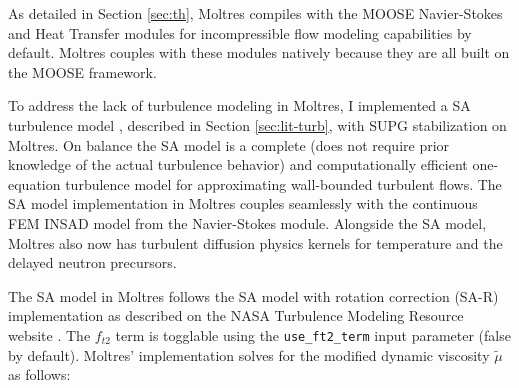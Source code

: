 As detailed in Section \ref{sec:th}, Moltres compiles with the MOOSE Navier-Stokes
\cite{peterson_overview_2018} and Heat Transfer modules for incompressible flow
modeling capabilities by default. Moltres couples with these modules natively because they are all
built on the MOOSE framework.


To address the lack of turbulence modeling in Moltres, I implemented a \gls{SA} turbulence model
\cite{spalart_one-equation_1994}, described in Section \ref{sec:lit-turb}, with \gls{SUPG}
stabilization on Moltres. On balance the \gls{SA} model is a complete (does not require prior
knowledge of the actual turbulence behavior) and computationally efficient one-equation turbulence
model for approximating wall-bounded turbulent flows. The \gls{SA} model implementation in Moltres
couples seamlessly with the continuous \gls{FEM} \gls{INSAD} \cite{lindsay_automatic_2021} model
from the Navier-Stokes module. Alongside the \gls{SA} model, Moltres also now has turbulent
diffusion physics kernels for temperature and the delayed neutron precursors.

The SA model in Moltres follows the \gls{SA} model with rotation correction (SA-R) implementation
\cite{aupoix_extensions_2003, dacles-mariani_numericalexperimental_1995} as described on the
\gls{NASA} Turbulence Modeling Resource website \cite{rumsey_turbulence_nodate}. The $f_{t2}$
term is togglable using the \texttt{use\_ft2\_term} input parameter (false by default). Moltres'
implementation solves for the modified dynamic viscosity $\tilde{\mu}$ as follows:

